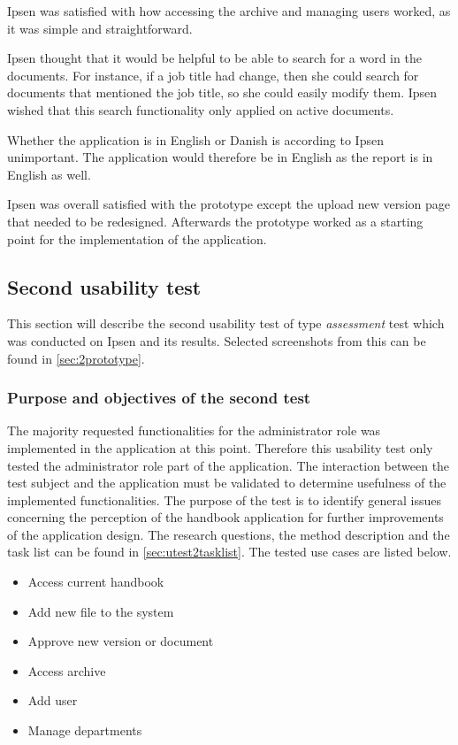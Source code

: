 \documentclass[../../master.tex]{subfiles}
\begin{document}
Ipsen was satisfied with how accessing the archive and managing users worked, as it was simple and straightforward.

Ipsen thought that it would be helpful to be able to search for a word in the documents.
For instance, if a job title had change, then she could search for documents that mentioned the job title, so she could easily modify them.
Ipsen wished that this search functionality only applied on active documents.

Whether the application is in English or Danish is according to Ipsen unimportant.
The application would therefore be in English as the report is in English as well.

Ipsen was overall satisfied with the prototype except the upload new version page that needed to be redesigned.
Afterwards the prototype worked as a starting point for the implementation of the application.

\subsection{Second usability test}\label{secondtest}
This section will describe the second usability test of type \textit{assessment} test which was conducted on Ipsen and its results. Selected screenshots from this can be found in \cref{sec:2prototype}.

\subsubsection*{Purpose and objectives of the second test}
The majority requested functionalities for the administrator role was implemented in the application at this point.
Therefore this usability test only tested the administrator role part of the application.
The interaction between the test subject and the application must be validated to determine usefulness of the implemented functionalities.
The purpose of the test is to identify general issues concerning the perception of the handbook application for further improvements of the application design.
The research questions, the method description and the task list can be found in \cref{sec:utest2tasklist}.
The tested use cases are listed below.

\begin{itemize}
	\item Access current handbook
	\item Add new file to the system
	\item Approve new version or document
	\item Access archive
	\item Add user
	\item Manage departments
\end{itemize}
\end{document}
